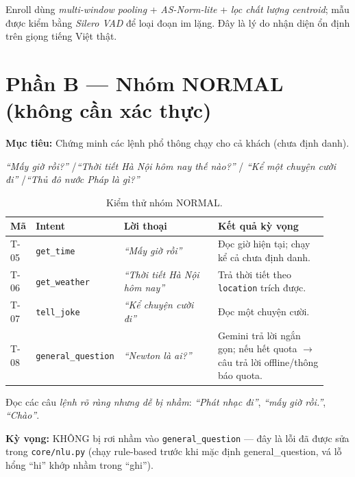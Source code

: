 \documentclass[12pt,a4paper]{article}
\newcommand{\role}[1]{\par\smallskip\noindent\textbf{\textcolor{hdr}{Mục tiêu:}} #1\par\smallskip}
\newcommand{\say}[1]{\textit{``#1''}}
\newcommand{\expect}[1]{\par\noindent\textbf{\textcolor{accent}{Kỳ vọng:}} #1\par}
\newcommand{\nrm}{\textcolor{normalc}{\textbf{NORMAL}}}
\begin{document}
\begin{diembox}
Enroll dùng \emph{multi-window pooling} + \emph{AS-Norm-lite} + \emph{lọc chất
lượng centroid}; mẫu được kiểm bằng \emph{Silero VAD} để loại đoạn im lặng. Đây
là lý do nhận diện ổn định trên giọng tiếng Việt thật.
\end{diembox}

\section{Phần B --- Nhóm \nrm{} (không cần xác thực)}
\role{Chứng minh các lệnh phổ thông chạy cho cả khách (chưa định danh).}

\begin{scriptbox}
\say{Mấy giờ rồi?} \quad/\quad \say{Thời tiết Hà Nội hôm nay thế nào?} \quad/\quad
\say{Kể một chuyện cười đi} \quad/\quad \say{Thủ đô nước Pháp là gì?}
\end{scriptbox}

\begin{table}[H]
\centering\small
\caption{Kiểm thử nhóm NORMAL.}
\begin{tabular}{p{0.07\linewidth}p{0.20\linewidth}p{0.30\linewidth}p{0.35\linewidth}}
\toprule
\textbf{Mã} & \textbf{Intent} & \textbf{Lời thoại} & \textbf{Kết quả kỳ vọng} \\
\midrule
T-05 & \texttt{get\_time} & \say{Mấy giờ rồi} & Đọc giờ hiện tại; chạy kể cả chưa định danh. \\
T-06 & \texttt{get\_weather} & \say{Thời tiết Hà Nội hôm nay} & Trả thời tiết theo \texttt{location} trích được. \\
T-07 & \texttt{tell\_joke} & \say{Kể chuyện cười đi} & Đọc một chuyện cười. \\
T-08 & \texttt{general\_question} & \say{Newton là ai?} & Gemini trả lời ngắn gọn; nếu hết quota $\to$ câu trả lời offline/thông báo quota. \\
\bottomrule
\end{tabular}
\end{table}

\begin{luuybox}
Đọc các câu \emph{lệnh rõ ràng nhưng dễ bị nhầm}: \say{Phát nhạc đi},
\say{mấy giờ rồi.}, \say{Chào}. \expect{KHÔNG bị rơi nhầm vào
\texttt{general\_question} --- đây là lỗi đã được sửa trong \texttt{core/nlu.py}
(chạy rule-based trước khi mặc định general\_question, vá lỗ hổng ``hi'' khớp
nhầm trong ``ghi'').}
\end{luuybox}
\end{document}
